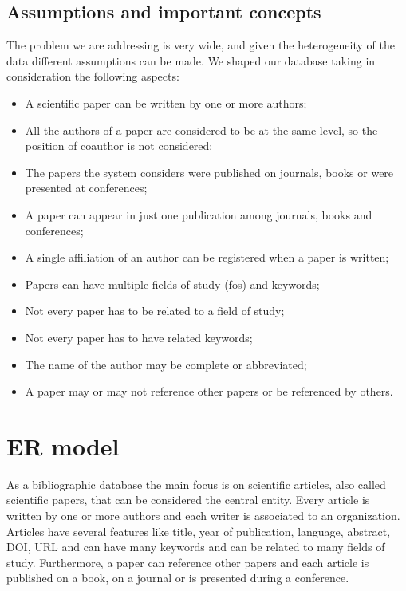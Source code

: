 \section{Assumptions and important concepts}
\label{sec:assumptions_and_important_concepts}%
The problem we are addressing is very wide, and given the heterogeneity of the data different assumptions can be made.
We shaped our database taking in consideration the following aspects:
\begin{itemize}
    \item A scientific paper can be written by one or more authors;
    \item All the authors of a paper are considered to be at the same level, so the position of coauthor is not considered;
    \item The papers the system considers were published on journals, books or were presented at conferences;
    \item A paper can appear in just one publication among journals, books and conferences;
    \item A single affiliation of an author can be registered when a paper is written;
    \item Papers can have multiple fields of study (fos) and keywords;
    \item Not every paper has to be related to a field of study;
    \item Not every paper has to have related keywords;
    \item The name of the author may be complete or abbreviated;
    \item A paper may or may not reference other papers or be referenced by others.
\end{itemize}


\chapter{ER model}
\label{ch:er_model}%
As a bibliographic database the main focus is on scientific articles, also called scientific papers, that can be considered the central entity.
Every article is written by one or more authors and each writer is associated to an organization.
Articles have several features like title, year of publication, language, abstract, DOI, URL and can have many keywords and can be related to many fields of study.
Furthermore, a paper can reference other papers and each article is published on a book, on a journal or is presented during a conference.

